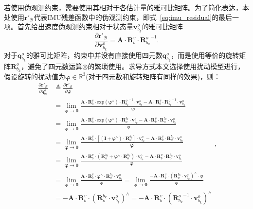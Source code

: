 若使用伪观测约束，需要使用其相对于各估计量的雅可比矩阵。为了简化表达，本处使用$\symbf{r}'_{\mathcal{B}}$代表IMU残差函数中的伪观测约束，即式~\ref{eq:imu_residual}的最后一项。首先给出速度伪观测约束相对于状态量$\symbf{v}_{b_{k}}^o$的雅可比矩阵
\begin{equation}
  \frac{\partial \symbf{r}'_{\mathcal{B}}}{\partial \symbf{v}_{b_{k}}^o} = \symbf{A} \cdot \symbf{R}_b^v \cdot {\symbf{R}_{b_k}^o}^{-1}.
\end{equation}
对于$\symbf{q}_{b_{k}}^o$的雅可比矩阵，约束中并没有直接使用四元数$\symbf{q}_{b_{k}}^o$，而是使用等价的旋转矩阵$\symbf{R}_{b_{k}}^o$，避免了四元数运算$\otimes$的繁琐使用。求导方式本文选择使用扰动模型\cite{imu_preintegration}进行，假设旋转的扰动值为$\symbf{\varphi } \in \mathbb{R}^3$(对于四元数和旋转矩阵有同样的效果)，则：
\begin{equation}
\begin{aligned}
  \frac{\partial \symbf{r}'_{\mathcal{B}}}{\partial \symbf{q}_{b_{k}}^o} &\triangleq  \frac{\partial \symbf{r}'_{\mathcal{B}}}{\partial \symbf{\varphi }} \\
  &= \lim\limits_{\symbf{\varphi } \to \symbf{0}} \frac{\symbf{A} \cdot \symbf{R}_b^v \cdot {\text{exp}(\symbf{\varphi }^{\land}) \cdot {\symbf{R}_{b_k}^o}^{-1}} \cdot \symbf{v}_{b_k}^o - \symbf{A} \cdot \symbf{R}_b^v \cdot {{\symbf{R}_{b_k}^o}^{-1}} \cdot \symbf{v}_{b_k}^o}{\symbf{\varphi }} \\
  &= \lim\limits_{\symbf{\varphi } \to \symbf{0}} \frac{\symbf{A} \cdot \symbf{R}_b^v \cdot {\text{exp}(\symbf{\varphi }^{\land}) \cdot \symbf{R}^{b_k}_o} \cdot \symbf{v}_{b_k}^o - \symbf{A} \cdot \symbf{R}_b^v \cdot {\symbf{R}^{b_k}_o} \cdot \symbf{v}_{b_k}^o}{\symbf{\varphi }} \\
  &= \lim\limits_{\symbf{\varphi } \to \symbf{0}} \frac{\symbf{A} \cdot \symbf{R}_b^v \cdot {[(\symbf{I} + \symbf{\varphi }^{\land}) \cdot \symbf{R}^{b_k}_o]} \cdot \symbf{v}_{b_k}^o - \symbf{A} \cdot \symbf{R}_b^v \cdot {\symbf{R}^{b_k}_o} \cdot \symbf{v}_{b_k}^o}{\symbf{\varphi }} \\
  &= \lim\limits_{\symbf{\varphi } \to \symbf{0}} \frac{\symbf{A} \cdot \symbf{R}_b^v \cdot {({\symbf{R}^{b_k}_o} + \symbf{\varphi }^{\land} \cdot \symbf{R}^{b_k}_o)} \cdot \symbf{v}_{b_k}^o - \symbf{A} \cdot \symbf{R}_b^v \cdot {\symbf{R}^{b_k}_o} \cdot \symbf{v}_{b_k}^o}{\symbf{\varphi }} \\
  &= \lim\limits_{\symbf{\varphi } \to \symbf{0}} \frac{\symbf{A} \cdot \symbf{R}_b^v \cdot {\symbf{\varphi }^{\land} \cdot \symbf{R}^{b_k}_o} \cdot \symbf{v}_{b_k}^o}{\symbf{\varphi }}
  = \lim\limits_{\symbf{\varphi } \to \symbf{0}} \frac{-\symbf{A} \cdot \symbf{R}_b^v \cdot ({\symbf{R}^{b_k}_o} \cdot \symbf{v}_{b_k}^{o})^{\land} \cdot \symbf{\varphi}}{\symbf{\varphi }} \\
  &= -\symbf{A} \cdot \symbf{R}_b^v \cdot ({\symbf{R}^{b_k}_o} \cdot \symbf{v}_{b_k}^{o})^{\land}
  = -\symbf{A} \cdot \symbf{R}_b^v \cdot ({\symbf{R}_{b_k}^o}^{-1} \cdot \symbf{v}_{b_k}^{o})^{\land}
\end{aligned},
\end{equation}
